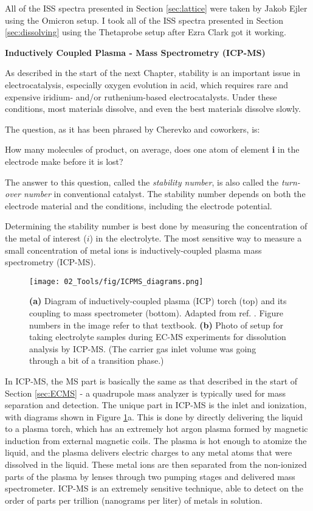 All of the ISS spectra presented in Section \ref{sec:lattice} were taken by Jakob Ejler using the Omicron setup. I took all of the ISS spectra presented in Section \ref{sec:dissolving} using the Thetaprobe setup after Ezra Clark got it working.


\textbf{Inductively Coupled Plasma - Mass Spectrometry (ICP-MS)}

As described in the start of the next Chapter, stability is an important issue in electrocatalysis, especially oxygen evolution in acid, which requires rare and expensive iridium- and/or ruthenium-based electrocatalysts. Under these conditions, most materials dissolve, and even the best materials dissolve slowly.

The question, as it has been phrased by Cherevko and coworkers\cite{Geiger2018}, is:
\begin{question}
	How many molecules of product, on average, does one atom of element \textbf{i} in the electrode make before it is lost?
\end{question}
The answer to this question, called the \textit{stability number}, is also called the \textit{turn-over number} in conventional catalyst. The stability number depends on both the electrode material and the conditions, including the electrode potential.

Determining the stability number is best done by measuring the concentration of the metal of interest ($i$) in the electrolyte. The most sensitive way to measure a small concentration of metal ions is inductively-coupled plasma mass spectrometry (ICP-MS)\cite{Harris2010, Frydendal2014}.
\begin{figure}[h!]
	\centering
	\texttt{[image: 02\_Tools/fig/ICPMS\_diagrams.png]}
	\caption{\textbf{(a)} Diagram of inductively-coupled plasma (ICP) torch (top) and its coupling to mass spectrometer (bottom). Adapted from ref. . Figure numbers in the image refer to that textbook. \textbf{(b)} Photo of setup for taking electrolyte samples during EC-MS experiments for dissolution analysis by ICP-MS. (The carrier gas inlet volume was going through a bit of a transition phase.) }
	\label{fig:ICPMS}
\end{figure}
In ICP-MS, the MS part is basically the same as that described in the start of Section \ref{sec:ECMS} - a quadrupole mass analyzer is typically used for mass separation and detection. The unique part in ICP-MS is the inlet and ionization\cite{Gross2007}, with diagrams shown in Figure \ref{fig:ICPMS}a. This is done by directly delivering the liquid to a plasma torch, which has an extremely hot argon plasma formed by magnetic induction from external magnetic coils. The plasma is hot enough to atomize the liquid, and the plasma delivers electric charges to any metal atoms that were dissolved in the liquid. These metal ions are then separated from the non-ionized parts of the plasma by lenses through two pumping stages and delivered mass spectrometer. ICP-MS is an extremely sensitive technique, able to detect on the order of parts per trillion (nanograms per liter) of metals in solution.

